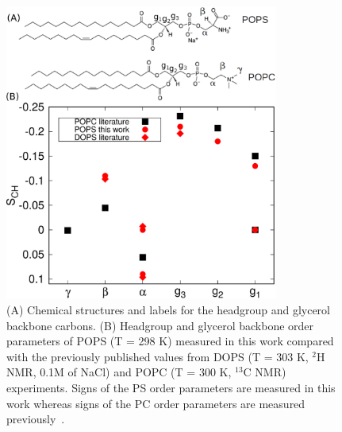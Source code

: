 \documentclass[aps,prl,superscriptaddress,twocolumn]{revtex4}
\begin{document}
\begin{figure}[!htb]
  \centering
  \includegraphics[width=9.0cm]{../Figs/PCPScomp.eps}
  \caption{\label{HGorderParameters}
    (A) Chemical structures and labels for the headgroup and glycerol backbone carbons.
    (B) Headgroup and glycerol backbone order parameters of POPS (T = 298 K) measured in this work compared
    with the previously published values from DOPS (T = 303 K, $^2$H NMR, 0.1M of NaCl) \cite{browning80} and 
    POPC  (T = 300 K, $^{13}$C NMR) \cite{ferreira13} experiments. Signs of the PS order parameters
    are measured in this work whereas signs of the PC order parameters are measured previously~\cite{ferreira16}.
  }
\end{figure}
\end{document}
